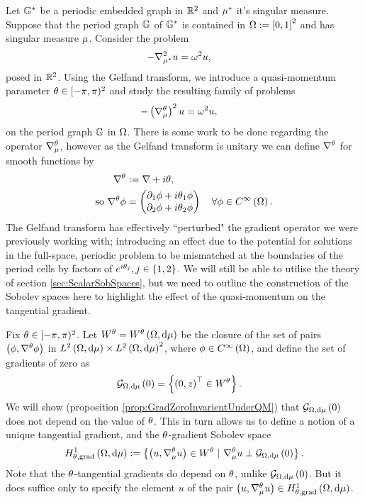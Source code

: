 Let $\mathbb{G}^*$ be a periodic embedded graph in $\mathbb{R}^2$ and $\mu^*$ it's singular measure.
Suppose that the period graph $\mathbb{G}$ of $\mathbb{G}^*$ is contained in $\Omega:=\left[ 0,1 \right]^2$ and has singular measure $\mu$.
Consider the problem
\begin{align} \label{eq:WholeSpaceScalarProblem}
	-\nabla_{\mu^*}^2 u &= \omega^2 u,
\end{align}
posed in $\mathbb{R}^2$.
Using the Gelfand transform, we introduce a quasi-momentum parameter $\theta\in[-\pi,\pi)^2$ and study the resulting family of problems
\begin{align*}
	- \left( \nabla_\mu^\theta \right)^2 u &= \omega^2 u,
\end{align*}
on the period graph $\mathbb{G}$ in $\Omega$.
There is some work to be done regarding the operator $\nabla_\mu^\theta$, however as the Gelfand transform is unitary we can define $\nabla^\theta$ for smooth functions by
\begin{align*}
	\nabla^\theta &:= \nabla + i\theta, \\
	\text{so } \nabla^\theta \phi &= \begin{pmatrix} \partial_1\phi + i\theta_1\phi \\ \partial_2\phi + i\theta_2\phi \end{pmatrix} \quad \forall\phi\in C^{\infty}\left( \Omega \right).
\end{align*}
The Gelfand transform has effectively ``perturbed" the gradient operator we were previously working with; introducing an effect due to the potential for solutions in the full-space, periodic problem to be mismatched at the boundaries of the period cells by factors of $e^{i\theta_j}, j\in\left\{ 1,2 \right\}$.
We will still be able to utilise the theory of section \ref{sec:ScalarSobSpaces}, but we need to outline the construction of the Sobolev spaces here to highlight the effect of the quasi-momentum on the tangential gradient.
\begin{definition} \label{def:qmGradSobs}
	Fix $\theta\in[-\pi,\pi)^2$.
	Let $W^\theta=W^\theta\left( \Omega,\mathrm{d}\mu \right)$ be the closure of the set of pairs $\left( \phi,\nabla^\theta\phi \right)$ in $L^{2}\left( \Omega,\mathrm{d}\mu \right)\times L^{2}\left( \Omega,\mathrm{d}\mu \right)^2$, where $\phi\in C^{\infty}\left( \Omega \right)$, and define the set of gradients of zero as
	\begin{align*}
		\mathcal{G}_{ \Omega, \mathrm{d}\mu}\left( 0 \right) &= \left\{ \left( 0,z \right)^\top \in W^{\theta} \right\}.
	\end{align*}
	We will show (proposition \ref{prop:GradZeroInvarientUnderQM}) that $\mathcal{G}_{ \Omega, \mathrm{d}\mu}\left( 0 \right)$ does not depend on the value of $\theta$.
	This in turn allows us to define a notion of a unique tangential gradient, and the $\theta$-gradient Sobolev space
	\begin{align*}
		H^1_{\theta, \mathrm{grad}}\left( \Omega, \mathrm{d}\mu \right) := \left\{ \left( u,\nabla_\mu^\theta u \right)\in W^\theta \ \vert \ \nabla_\mu^\theta u \perp \mathcal{G}_{ \Omega, \mathrm{d}\mu}\left( 0 \right)  \right\}.
	\end{align*}
	Note that the $\theta$-tangential gradients do depend on $\theta$, unlike $\mathcal{G}_{ \Omega, \mathrm{d}\mu}\left( 0 \right)$.
	But it does suffice only to specify the element $u$ of the pair $\left( u,\nabla_\mu^\theta u \right)\in H^1_{\theta, \mathrm{grad}}\left( \Omega, \mathrm{d}\mu \right)$.
\end{definition}

